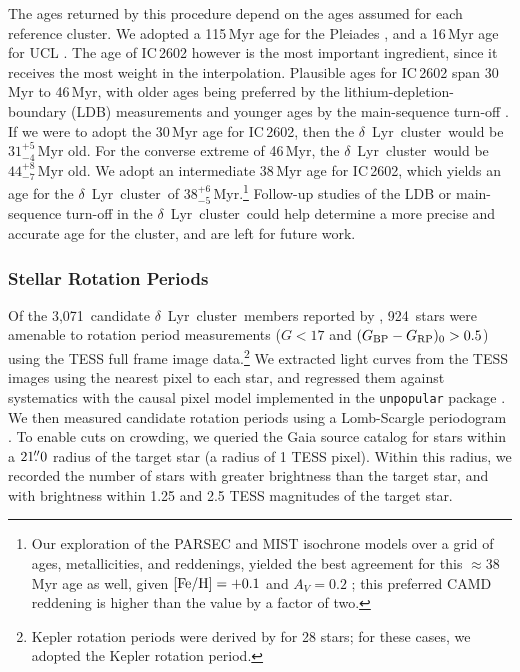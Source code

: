 \documentclass[12pt,modern,twocolumn,tighten]{aastex63}
\newcommand{\cn}{$\delta$\ Lyr\ cluster} %
\newcommand{\clusterage}{$38^{+6}_{-5}$\,Myr} %
\newcommand{\noriginal}{3{,}071} %
\newcommand{\nwithtess}{924} %
\newcommand{\bpmrpo}{(G_{\rm BP}-G_{\rm RP})_0}
\begin{document}

The ages returned by this procedure depend on the ages assumed for
each reference cluster.  We adopted a 115\,Myr age for the Pleiades
\citep{dahm_2015}, and a 16\,Myr age for UCL \citep{pecaut_star_2016}.
The age of IC\,2602 however is the most important ingredient, since it
receives the most weight in the interpolation.  Plausible ages for
IC\,2602 span 30\,Myr to 46\,Myr, with older ages being preferred by
the lithium-depletion-boundary (LDB) measurements
\citep{dobbie_ic_2010,randich_gaiaeso_2018} and younger ages by the
main-sequence turn-off
\citep{stauffer_rotational_1997,david_ages_2015,bossini_age_2019}.  If
we were to adopt the 30\,Myr age for IC\,2602, then the \cn\ would be
$31^{+5}_{-4}$\,Myr old.  For the converse extreme of 46\,Myr, the
\cn\ would be $44^{+8}_{-7}$\,Myr old.  We adopt an intermediate
38\,Myr age for IC\,2602, which yields an age for the \cn\ of
\clusterage.\footnote{Our exploration of the PARSEC and MIST isochrone
models over a grid of ages, metallicities, and reddenings, yielded the
best agreement for this $\approx 38\,$Myr age as well, given ${\rm
[Fe/H] = +0.1}$ and $A_V=0.2$
\citep{bressan_parsec_2012,choi_mesa_2016};  this preferred CAMD
reddening is higher than the \citet{lallement_threedimensional_2018}
value by a factor of two.  } Follow-up studies of the LDB or
main-sequence turn-off in the \cn\ could help determine a more precise
and accurate age for the cluster, and are left for future work.


\subsubsection{Stellar Rotation Periods}

Of the \noriginal\ candidate \cn\ members reported by
\citet{KounkelCovey2019}, \nwithtess\ stars were amenable to rotation
period measurements ($G<17$ and $\bpmrpo>0.5$) using the TESS full
frame image data.\footnote{Kepler rotation periods were derived by
\citet{mcquillan_rotation_2014} for 28 stars; for these cases, we
adopted the Kepler rotation period.  } We extracted light curves from
the TESS images using the nearest pixel to each star, and regressed
them against systematics with the causal pixel model implemented in
the \texttt{unpopular} package \citep{hattorio_2021_cpm}.  We then
measured candidate rotation periods using a Lomb-Scargle periodogram
\citep{lomb_1976,scargle_studies_1982,astropy_2018}.  To enable cuts
on crowding, we queried the Gaia source catalog for stars within a
$21\mbox{$.\!\!^{\prime\prime}$}0$ radius of the target star (a radius of 1 TESS pixel).
Within this radius, we recorded the number of stars with greater
brightness than the target star, and with brightness within 1.25 and
2.5 TESS magnitudes of the target star.  
\end{document}
